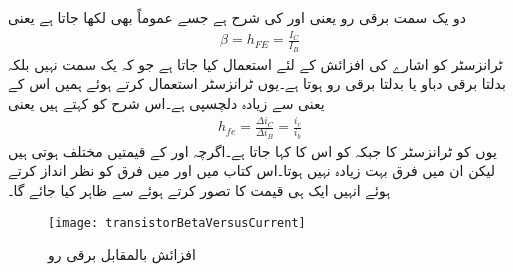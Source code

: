  دو یک سمت برقی رو یعنی  اور  کی شرح ہے  جسے عموماً  بھی لکھا جاتا ہے یعنی 
\begin{align}
\beta = h_{FE}=\frac{I_C}{I_B}
\end{align}
ٹرانزسٹر کو اشارے کی افزائش کے لئے استعمال کیا جاتا ہے جو کہ یک سمت نہیں بلکہ بدلتا برقی دباو یا بدلتا برقی رو ہوتا ہے۔یوں ٹرانزسٹر استعمال کرتے ہوئے ہمیں اس کے  یعنی  سے زیادہ دلچسپی ہے۔اس شرح کو  کہتے ہیں یعنی
\begin{align}
h_{fe}=\frac{\Delta i_C}{\Delta i_B}=\frac{i_c}{i_b}
\end{align}
یوں  کو ٹرانزسٹر کا  جبکہ  کو اس کا  کہا جاتا ہے۔اگرچہ  اور  کے قیمتیں مختلف ہوتی ہیں لیکن ان میں فرق بہت زیادہ نہیں ہوتا۔اس کتاب میں  اور  میں فرق کو نظر انداز کرتے ہوئے انہیں ایک ہی قیمت کا تصور کرتے ہوئے  سے ظاہر کیا جائے گا۔
\begin{figure}
\centering
\texttt{[image: transistorBetaVersusCurrent]}
\caption{افزائش بالمقابل برقی رو}
\label{شکل_افزائش_بالمقابم_برقی_رو}
\end{figure}

